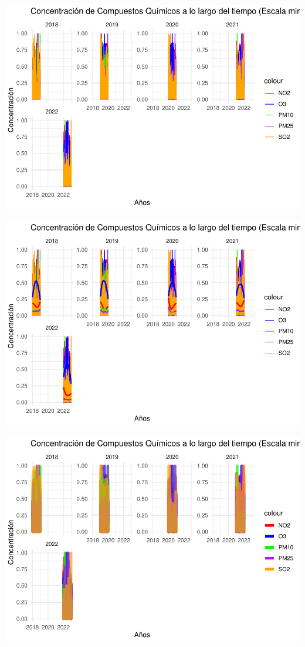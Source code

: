 \documentclass[notspecified,article,submit,moreauthors,pdftex]{Definitions/mdpi}
\begin{document}
\includegraphics{ProyectoAED2023_files/figure-latex/unnamed-chunk-22-1.pdf}

\includegraphics{ProyectoAED2023_files/figure-latex/unnamed-chunk-23-1.pdf}

\includegraphics{ProyectoAED2023_files/figure-latex/unnamed-chunk-24-1.pdf}
\end{document}
